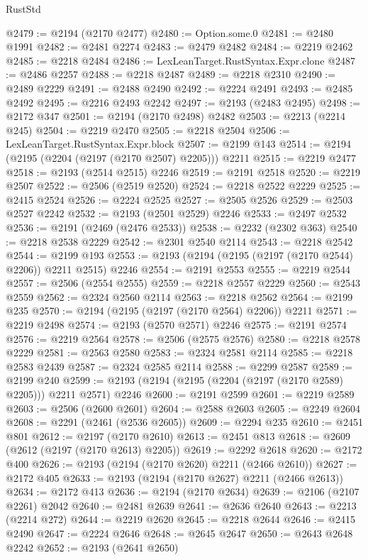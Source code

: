 \begin{lexlean}{RustStd}
\begin{coremodule}
{\begin{coremodule}
{{{{{{{{{{{{{{{{{{{{{{{{{{@2479 := @2194 (@2170 @2477)
@2480 := Option.some.{0}
@2481 := @2480 @1991
@2482 := @2481 @2274
@2483 := @2479 @2482
@2484 := @2219 @2462
@2485 := @2218 @2484
@2486 := LexLeanTarget.RustSyntax.Expr.clone
@2487 := @2486 @2257
@2488 := @2218 @2487
@2489 := @2218 @2310
@2490 := @2489 @2229
@2491 := @2488 @2490
@2492 := @2224 @2491
@2493 := @2485 @2492
@2495 := @2216 @2493 @2242
@2497 := @2193 (@2483 @2495)
@2498 := @2172 @347
@2501 := @2194 (@2170 @2498) @2482
@2503 := @2213 (@2214 @245)
@2504 := @2219 @2470
@2505 := @2218 @2504
@2506 := LexLeanTarget.RustSyntax.Expr.block
@2507 := @2199 @143
@2514 := @2194 (@2195 (@2204 (@2197 (@2170 @2507) @2205))) @2211
@2515 := @2219 @2477
@2518 := @2193 (@2514 @2515) @2246
@2519 := @2191 @2518
@2520 := @2219 @2507
@2522 := @2506 (@2519 @2520)
@2524 := @2218 @2522 @2229
@2525 := @2415 @2524
@2526 := @2224 @2525
@2527 := @2505 @2526
@2529 := @2503 @2527 @2242
@2532 := @2193 (@2501 @2529) @2246
@2533 := @2497 @2532
@2536 := @2191 (@2469 (@2476 @2533))
@2538 := @2232 (@2302 @363)
@2540 := @2218 @2538 @2229
@2542 := @2301 @2540 @2114
@2543 := @2218 @2542
@2544 := @2199 @193
@2553 := @2193 (@2194 (@2195 (@2197 (@2170 @2544) @2206)) @2211 @2515) @2246
@2554 := @2191 @2553
@2555 := @2219 @2544
@2557 := @2506 (@2554 @2555)
@2559 := @2218 @2557 @2229
@2560 := @2543 @2559
@2562 := @2324 @2560 @2114
@2563 := @2218 @2562
@2564 := @2199 @235
@2570 := @2194 (@2195 (@2197 (@2170 @2564) @2206)) @2211
@2571 := @2219 @2498
@2574 := @2193 (@2570 @2571) @2246
@2575 := @2191 @2574
@2576 := @2219 @2564
@2578 := @2506 (@2575 @2576)
@2580 := @2218 @2578 @2229
@2581 := @2563 @2580
@2583 := @2324 @2581 @2114
@2585 := @2218 @2583 @2439
@2587 := @2324 @2585 @2114
@2588 := @2299 @2587
@2589 := @2199 @240
@2599 := @2193 (@2194 (@2195 (@2204 (@2197 (@2170 @2589) @2205))) @2211 @2571) @2246
@2600 := @2191 @2599
@2601 := @2219 @2589
@2603 := @2506 (@2600 @2601)
@2604 := @2588 @2603
@2605 := @2249 @2604
@2608 := @2291 (@2461 (@2536 @2605))
@2609 := @2294 @235
@2610 := @2451 @801
@2612 := @2197 (@2170 @2610)
@2613 := @2451 @813
@2618 := @2609 (@2612 (@2197 (@2170 @2613) @2205))
@2619 := @2292 @2618
@2620 := @2172 @400
@2626 := @2193 (@2194 (@2170 @2620) @2211 (@2466 @2610))
@2627 := @2172 @405
@2633 := @2193 (@2194 (@2170 @2627) @2211 (@2466 @2613))
@2634 := @2172 @413
@2636 := @2194 (@2170 @2634)
@2639 := @2106 (@2107 @2261) @2042
@2640 := @2481 @2639
@2641 := @2636 @2640
@2643 := @2213 (@2214 @272)
@2644 := @2219 @2620
@2645 := @2218 @2644
@2646 := @2415 @2490
@2647 := @2224 @2646
@2648 := @2645 @2647
@2650 := @2643 @2648 @2242
@2652 := @2193 (@2641 @2650)
}}}}}}}}}}}}}}}}}}}}}}}}}}
\end{coremodule}}
\end{coremodule}
\end{lexlean}
